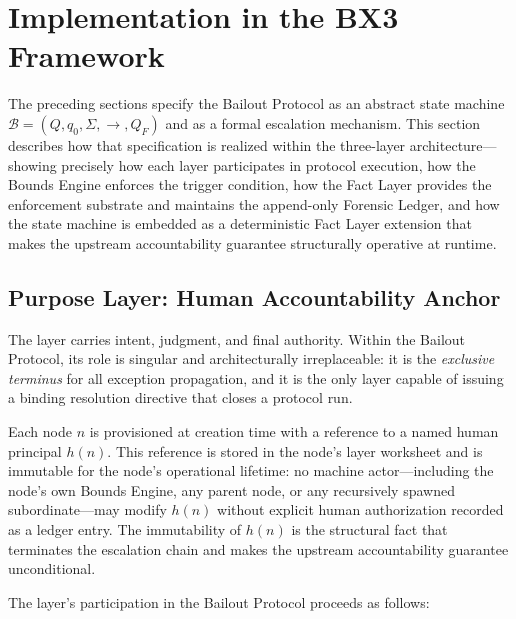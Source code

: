 \section{Implementation in the BX3 Framework}\label{sec:implementation}

The preceding sections specify the Bailout Protocol as an abstract state machine $\mathcal{B} = (Q, q_0, \Sigma, \rightarrow, Q_F)$ and as a formal escalation mechanism. This section describes how that specification is realized within the \bxthree{} three-layer architecture---showing precisely how each layer participates in protocol execution, how the Bounds Engine enforces the trigger condition, how the Fact Layer provides the enforcement substrate and maintains the append-only Forensic Ledger, and how the state machine is embedded as a deterministic Fact Layer extension that makes the upstream accountability guarantee structurally operative at runtime.

\subsection{Purpose Layer: Human Accountability Anchor}\label{sec:purpose-layer}

The \purpose{} layer carries intent, judgment, and final authority. Within the Bailout Protocol, its role is singular and architecturally irreplaceable: it is the \emph{exclusive terminus} for all exception propagation, and it is the only layer capable of issuing a binding resolution directive that closes a protocol run.

Each \bxthree{} node $n$ is provisioned at creation time with a reference to a named human principal $h(n)$. This reference is stored in the node's \purpose{} layer worksheet and is immutable for the node's operational lifetime: no machine actor---including the node's own Bounds Engine, any parent node, or any recursively spawned subordinate---may modify $h(n)$ without explicit human authorization recorded as a ledger entry. The immutability of $h(n)$ is the structural fact that terminates the escalation chain and makes the upstream accountability guarantee unconditional.

The \purpose{} layer's participation in the Bailout Protocol proceeds as follows:

